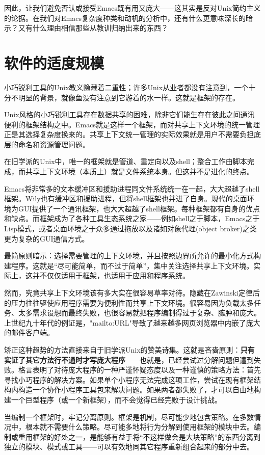 \documentclass[12pt,oneside]{book}
\begin{document}
因此，让我们避免否认或接受Emacs既有用又庞大——这其实是反对Unix简约主义的论据。在我们对Emacs复杂度种类和动机的分析中，还有什么更意味深长的暗示？又有什么理由相信那些从教训归纳出来的东西？


\section{软件的适度规模}
小巧锐利工具的Unix教义隐藏着二重性；许多Unix从业者都没有注意到，一个十分不明显的背景，就像鱼没有注意到它游着的水一样。这就是框架的存在。

Unix风格的小巧锐利工具存在数据共享的困难，除非它们能生存在彼此之间通讯便利的框架结构之中。Emacs就是这样一个框架，而对共享上下文环境的统一管理正是其选择复杂度换来的。共享上下文统一管理的实际效果就是用户不需要负担底层的命名和资源管理问题。

在旧学派的Unix中，唯一的框架就是管道、重定向以及shell；整合工作由脚本完成，而共享上下文环境（本质上）就是文件系统本身。但这并不是进化的终点。

Emacs将非常多的文本缓冲区和援助进程同文件系统统一在一起，大大超越了shell框架。Wily也有缓冲区和援助进程，但将shell框架也并进了自身。现代的桌面环境为GUI提供了一个通讯框架，也大大超越了shell框架。每种框架都有自身的优点和缺点。而框架成为了各种工具生态系统之家——例如shell之于脚本，Emacs之于Lisp模式，或者桌面环境之于众多通过拖放以及诸如对象代理(object broker)之类更为复杂的GUI通信方式。

最简原则暗示：选择需要管理的上下文环境，并且按照边界所允许的最小化方式构建程序。这就是“尽可能简单，而不过于简单”，集中关注选择共享上下文环境。实际上，这并不仅仅适用于框架，也适用于应用和程序系统。

然而，究竟共享上下文环境该有多大实在很容易草率对待。隐藏在Zawinski定律后的压力往往驱使应用程序需要为便利性而共享上下文环境。很容易因为负载太多任务、太多需求设想而最终失败，也很容易就把程序编制得过于复杂、臃肿和庞大。上世纪九十年代的例证是，"mailto:URL"导致了越来越多网页浏览器中内嵌了庞大的邮件客户端。

矫正这种趋势的方法直接来自于旧学派Unix的赞美诗集。这就是吝啬原则：\textbf{只有实证了其它方法行不通时才写庞大程序}——也就是，已经尝试过分解问题但遭到失败。格言表明了对待庞大程序的一种严谨怀疑态度以及一种谨慎的策略方法：首先寻找小巧程序的解决方案。如果单个小程序无法完成这项工作，尝试在现有框架结构内构造一个协作小程序工具包来解决问题。如果两者都失败了，才可以自由地构建一个巨型程序（或一个新框架），而不会觉得已经完败于设计挑战。

当编制一个框架时，牢记分离原则。框架是机制，尽可能少地包含策略。在多数情况中，根本就不需要什么策略。尽可能多地将行为分解到使用框架的模块中去。编制或重用框架的好处之一，是能够有益于将“不这样做会是大块策略”的东西分离到独立的模块、模式或工具——可以有效地同其它程序重新组合起来的部分中去。
\end{document}
